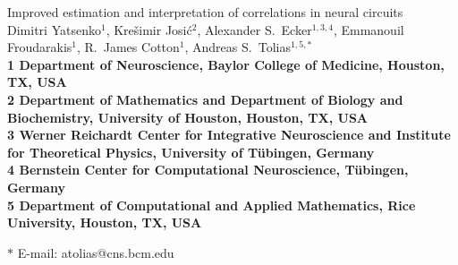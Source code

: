 \documentclass[10pt]{article}
\date{}
\begin{document}
\begin{flushleft}
{\Large
Improved estimation and interpretation of correlations in neural circuits
}
\\
Dimitri Yatsenko$^{1}$, 
Kre\v{s}imir Josi\'{c}$^{2}$,
Alexander S.~Ecker$^{1,3,4}$,
Emmanouil Froudarakis$^{1}$,
R.~James Cotton$^{1}$,
Andreas S.~Tolias$^{1,5,\ast}$
\\
\bf{1} Department of Neuroscience, Baylor College of Medicine, Houston, TX, USA
\\
\bf{2} Department of Mathematics and Department of Biology and Biochemistry, University of Houston, Houston, TX, USA
\\
\bf{3}  Werner Reichardt Center for Integrative Neuroscience and Institute for Theoretical Physics, University of T\"ubingen, Germany
\\
\bf{4} Bernstein Center for Computational Neuroscience, T\"ubingen, Germany
\\
\bf{5} Department of Computational and Applied Mathematics, Rice University, Houston, TX, USA

$\ast$ E-mail: atolias@cns.bcm.edu
\end{flushleft}
\end{document}
